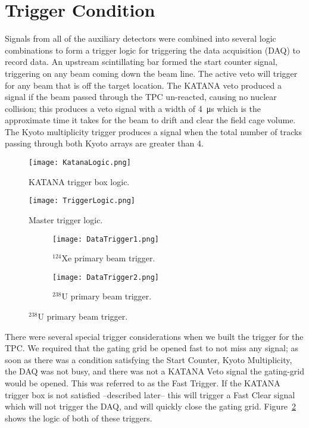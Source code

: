 \section{Trigger Condition}
Signals from all of the auxiliary detectors were combined into several logic combinations to form a trigger logic for triggering the data acquisition  (DAQ) to record data. An upstream scintillating bar formed the start counter signal, triggering on any beam coming down the beam line. The active veto will trigger for any beam that is off the target location. The KATANA veto produced a signal if the beam passed through the TPC un-reacted, causing no nuclear collision; this produces a veto signal with a width of \SI{4}{\micro\second} which is the approximate time it takes for the beam to drift and clear the field cage volume. The Kyoto multiplicity trigger produces a signal when the total number of tracks passing through both Kyoto arrays are greater than 4. 


\begin{figure}[!htb]
\texttt{[image: KatanaLogic.png]}
\caption{KATANA trigger box logic.}
\label{fig:katanaLogic}
\end{figure}

\begin{figure}[!htb]
\texttt{[image: TriggerLogic.png]} 
\caption{Master trigger logic.}
\label{fig:trigLogic} 
\end{figure}



\begin{figure}[!htb]
    \centering
    \begin{subfigure}[t]{0.45\textwidth}
        \centering
        \texttt{[image: DataTrigger1.png]} 
        \caption{${}^{124}$Xe primary beam trigger.} \label{fig:dataTrigger1}
    \end{subfigure}
    \hfill
    \begin{subfigure}[t]{0.45\textwidth}
        \centering
        \texttt{[image: DataTrigger2.png]} 
        \caption{${}^{238}$U primary beam trigger.} \label{fig:dataTrigger2}
    \end{subfigure}
\label{fig:datatrigger}
\end{figure}


There were several special trigger considerations when we built the trigger for the TPC. We required that the gating grid be opened fast to not miss any signal; as soon as there was a condition satisfying the Start Counter, Kyoto Multiplicity, the DAQ was not busy, and there was not a KATANA Veto signal the gating-grid would be opened. This was referred to as the Fast Trigger. If the KATANA trigger box is not satisfied --described later-- this will trigger a Fast Clear signal which will not trigger the DAQ, and will quickly close the gating grid. Figure~\ref{fig:trigLogic} shows the logic of both of these triggers. 

